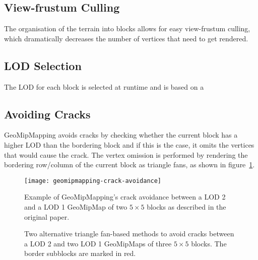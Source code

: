 \subsection{View-frustum Culling}
The organisation of the terrain into blocks allows for easy view-frustum culling,
which dramatically decreases the number of vertices that need to get rendered.


\subsection{LOD Selection}
The LOD for each block is selected at runtime and is based on a 

\subsection{Avoiding Cracks}
GeoMipMapping avoids cracks by checking whether the
current block has a higher LOD than the bordering block and if this is the case,
it omits the vertices that would cause the crack.
The vertex omission is performed by rendering the bordering row/column of the current block
as triangle fans, as shown in figure~\ref{fig:geomipmapping-crack-avoidance}.

\begin{figure}[H]
  \centering
  \texttt{[image: geomipmapping-crack-avoidance]}
  \caption{Example of GeoMipMapping's crack avoidance between a LOD 2 and a LOD 1 GeoMipMap of two $5 \times 5$ blocks as described in the original paper.}\label{fig:geomipmapping-crack-avoidance}
\end{figure}



\begin{figure}[H]
  \centering
  \qquad
  \caption{Two alternative triangle fan-based methods to avoid cracks between a LOD 2 and two LOD 1 GeoMipMaps of three $5 \times 5$ blocks. The border subblocks are marked in red.}\label{fig:geomipmapping-crack-avoidance-alternative}
\end{figure}

